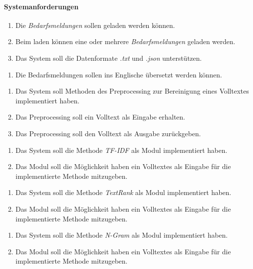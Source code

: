 \paragraph{Systemanforderungen}
\begin{enumerate}[label=1.\arabic*]
	\item Die \emph{Bedarfsmeldungen} sollen geladen werden können.
	\item Beim laden können eine oder mehrere \emph{Bedarfsmeldungen} geladen werden.
	\item Das System soll die Datenformate \emph{.txt} und \emph{.json} unterstützen.
\end{enumerate}
\begin{enumerate}[label=2.\arabic*]
	\item Die Bedarfsmeldungen sollen ins Englische übersetzt werden können.
\end{enumerate}
\begin{enumerate}[label=3.\arabic*]
	\item Das System soll Methoden des Preprocessing zur Bereinigung eines Volltextes implementiert haben.
	\item Das Preprocessing soll ein Volltext als Eingabe erhalten.
	\item Das Preprocessing soll den Volltext als Ausgabe zurückgeben.
\end{enumerate}
\begin{enumerate}[label=4.\arabic*]
	\item Das System soll die Methode \emph{TF-IDF} als Modul implementiert haben.
	\item Das Modul soll die Möglichkeit haben ein Volltextes als Eingabe für die implementierte Methode mitzugeben.
\end{enumerate}
\begin{enumerate}[label=5.\arabic*]
	\item Das System soll die Methode \emph{TextRank} als Modul implementiert haben.
	\item Das Modul soll die Möglichkeit haben ein Volltextes als Eingabe für die implementierte Methode mitzugeben.
\end{enumerate}
\begin{enumerate}[label=6.\arabic*]
	\item Das System soll die Methode \emph{N-Gram} als Modul implementiert haben.
	\item Das Modul soll die Möglichkeit haben ein Volltextes als Eingabe für die implementierte Methode mitzugeben.
\end{enumerate}
